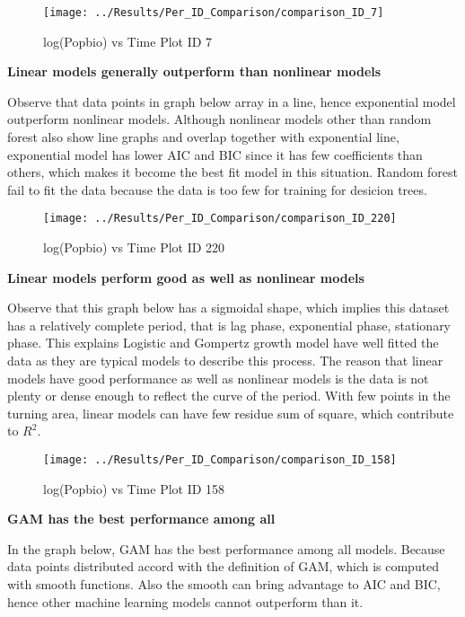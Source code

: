 \documentclass[11pt]{article}
\begin{document}
\begin{figure}[H]
    \centering
    \texttt{[image: ../Results/Per\_ID\_Comparison/comparison\_ID\_7]} 
    \caption{log(Popbio) vs Time Plot ID 7}
    \label{fig:scatter3}
\end{figure}

\noindent \textbf{Linear models generally outperform than nonlinear models}

Observe that data points in graph below array in a line, hence exponential model outperform nonlinear models. Although nonlinear models other than random forest also show line graphs and overlap together with exponential line, exponential model has lower AIC and BIC since it has few coefficients than others, which makes it become the best fit model in this situation. Random forest fail to fit the data because the data is too few for training for desicion trees.

\begin{figure}[H]
    \centering
    \texttt{[image: ../Results/Per\_ID\_Comparison/comparison\_ID\_220]} 
    \caption{log(Popbio) vs Time Plot ID 220}
    \label{fig:scatter4}
\end{figure}

\noindent \textbf{Linear models perform good as well as nonlinear models}

Observe that this graph below has a sigmoidal shape, which implies this dataset has a relatively complete period, that is lag phase, exponential phase, stationary phase. This explains Logistic and Gompertz growth model have well fitted the data as they are typical models to describe this process. The reason that linear models have good performance as well as nonlinear models is the data is not plenty or dense enough to reflect the curve of the period. With few points in the turning area, linear models can have few residue sum of square, which contribute to $R^2$. 

\begin{figure}[H]
    \centering
    \texttt{[image: ../Results/Per\_ID\_Comparison/comparison\_ID\_158]} 
    \caption{log(Popbio) vs Time Plot ID 158}
    \label{fig:scatter5}
\end{figure}

\noindent \textbf{GAM has the best performance among all}

In the graph below, GAM has the best performance among all models. Because data points distributed accord with the definition of GAM, which is computed with smooth functions. Also the smooth can bring advantage to AIC and BIC, hence other machine learning models cannot outperform than it.
\end{document}
